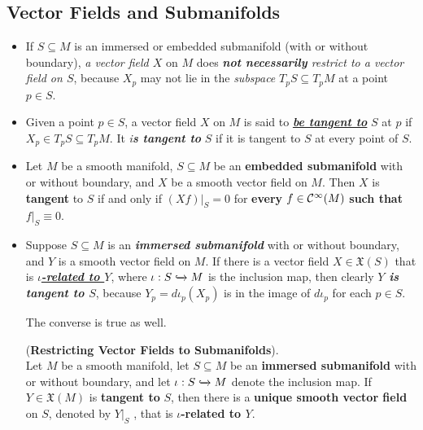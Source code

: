 \documentclass[11pt]{article}
\begin{document}
\subsection{Vector Fields and Submanifolds}
\begin{itemize}
\item \begin{remark}
If $S \subseteq M$ is an immersed or embedded submanifold (with or without boundary), \emph{a vector field $X$} on $M$ does \emph{\textbf{not necessarily} restrict to a vector field on $S$}, because $X_p$ may not lie in the \emph{subspace} $T_{p}S \subseteq T_{p}M$ at a point $p \in S$.
\end{remark}


\item \begin{definition}
Given a point $p \in S$, a vector field $X$ on $M$ is said to \underline{\emph{\textbf{be tangent to}}} $S$ at $p$ if $X_p \in T_{p}S \subseteq T_{p}M$. It \emph{i\textbf{s tangent to}} $S$ if it is tangent to $S$ at every point of $S$.
\end{definition}

\item \begin{proposition}
Let $M$ be a smooth manifold, $S\subseteq M$ be an \textbf{embedded submanifold} with or without boundary, and $X$ be a smooth vector field on $M$. Then $X$ is
\textbf{tangent} to $S$ if and only if $(Xf)|_{S} = 0$ for \textbf{every} \underline{$f \in {\mathcal C}^{\infty}(M)$}  \textbf{such that} \underline{$f|_{S}\equiv 0$}.
\end{proposition}

\item \begin{remark}
Suppose $S\subseteq M$ is an \textbf{\emph{immersed submanifold}} with or without boundary, and $Y$ is a smooth vector field on $M$. If there is a vector field $X \in \mathfrak{X}(S)$ that is \underline{\emph{\textbf{$\iota$-related to $Y$}}}, where $\iota: S \xhookrightarrow{} M$ is the inclusion map, then clearly \emph{\textbf{$Y$ is tangent to $S$}}, because $Y_p = d\iota_{p}(X_p)$ is in the image of $d\iota_p$ for each $p \in S$. 

The converse is true as well.
\begin{proposition} (\textbf{Restricting Vector Fields to Submanifolds}). \citep{lee2003introduction}\\
Let $M$ be a  smooth manifold, let $S\subseteq M$ be an \textbf{immersed submanifold} with or without boundary, and let $\iota: S \xhookrightarrow{} M$ denote the inclusion map. If $Y \in \mathfrak{X}(M)$ is \textbf{tangent to} $S$, then there is a \textbf{unique smooth vector field} on $S$, denoted by $Y|_{S}$ , that is \textbf{$\iota$-related to $Y$}.
\end{proposition}
\end{remark}
\end{itemize}
\end{document}
